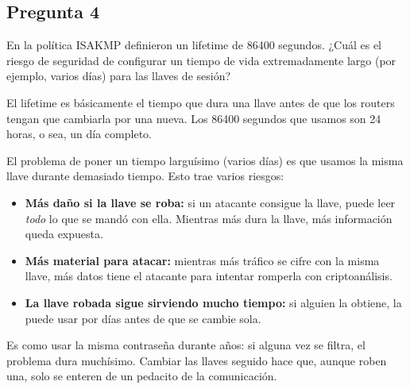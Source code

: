 \subsection{Pregunta 4}

En la política ISAKMP definieron un lifetime de 86400 segundos. ¿Cuál es el riesgo de seguridad de configurar un tiempo de vida extremadamente largo (por ejemplo, varios días) para las llaves de sesión?

\begin{respuesta}
El lifetime es básicamente el tiempo que dura una llave antes de que los routers
tengan que cambiarla por una nueva. Los 86400 segundos que usamos son 24 horas,
o sea, un día completo.

El problema de poner un tiempo larguísimo (varios días) es que usamos la misma
llave durante demasiado tiempo. Esto trae varios riesgos:

\begin{itemize}
    \item \textbf{Más daño si la llave se roba:} si un atacante consigue la llave,
    puede leer \emph{todo} lo que se mandó con ella. Mientras más dura la llave,
    más información queda expuesta.
    \item \textbf{Más material para atacar:} mientras más tráfico se cifre con la
    misma llave, más datos tiene el atacante para intentar romperla con
    criptoanálisis.
    \item \textbf{La llave robada sigue sirviendo mucho tiempo:} si alguien la
    obtiene, la puede usar por días antes de que se cambie sola.
\end{itemize}

Es como usar la misma contraseña durante años: si alguna vez se filtra, el
problema dura muchísimo. Cambiar las llaves seguido hace que, aunque roben una,
solo se enteren de un pedacito de la comunicación.
    
\end{respuesta}
